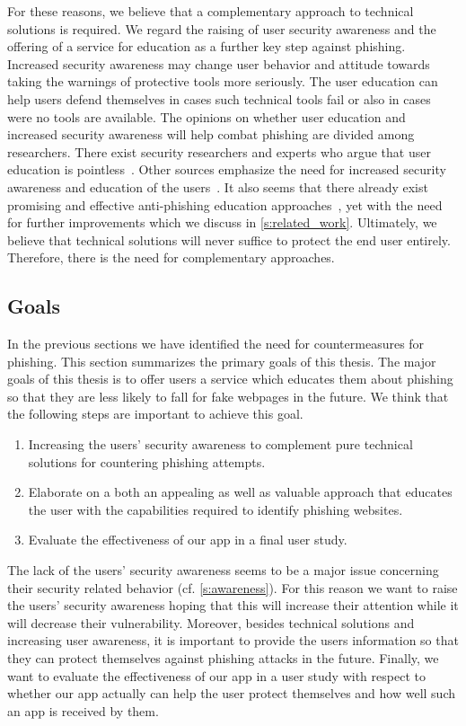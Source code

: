 For these reasons, we believe that a complementary approach to technical solutions is required.
We regard the raising of user security awareness and the offering of a service for education as a further key step against phishing.
Increased security awareness may change user behavior and attitude towards taking the warnings of protective tools more seriously.
The user education can help users defend themselves in cases such technical tools fail or also in cases were no tools are available.
The opinions on whether user education and increased security awareness will help combat phishing are divided among researchers.
There exist security researchers and experts who argue that user education is pointless~\cite{useredupointless, bruceschneieronsecuritytraining}.
Other sources emphasize the need for increased security awareness and education of the users~\cite{usereducebit, usereduscmagazine}.
It also seems that there already exist promising and effective anti-phishing education approaches~\cite{kumaraguru2007protecting, sheng2007antiphishingphil}, yet with the need for further improvements which we discuss in \autoref{s:related_work}.
Ultimately, we believe that technical solutions will never suffice to protect the end user entirely.
Therefore, there is the need for complementary approaches.
 
\subsection{Goals}
\label{s:goals}
In the previous sections we have identified the need for countermeasures for phishing.
This section summarizes the primary goals of this thesis.
The major goals of this thesis is to offer users a service which educates them about phishing so that they are less likely to fall for fake webpages in the future.
 We think that the following steps are important to achieve this goal.

\begin{enumerate}
	\item Increasing the users' security awareness to complement pure technical solutions for countering phishing attempts.
	\item Elaborate on a both an appealing as well as valuable approach that educates the user with the capabilities required to identify phishing websites.
	\item Evaluate the effectiveness of our app in a final user study.
\end{enumerate}
The lack of the users' security awareness seems to be a major issue concerning their security related behavior (cf. \autoref{s:awareness}).
 For this reason we want to raise the users' security awareness hoping that this will increase their attention while it will decrease their vulnerability.
 Moreover, besides technical solutions and increasing user awareness, it is important to provide the users information so that they can protect themselves against phishing attacks in the future.
Finally, we want to evaluate the effectiveness of our app in a user study with respect to whether our app actually can help the user protect themselves and how well such an app is received by them.

